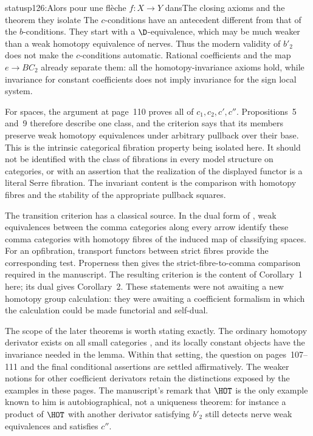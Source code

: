 \begin{dcomment}{status}{p126:Alors pour une flèche $f : X \to Y$ dans}{The closing axioms and the theorem they isolate}
The $c$-conditions have an antecedent different from that of the $b$-conditions. They start with a $\D$-equivalence, which may be much weaker than a weak homotopy equivalence of nerves. Thus the modern validity of $b'_2$ does not make the $c$-conditions automatic. Rational coefficients and the map $e\to BC_2$ already separate them: all the homotopy-invariance axioms hold, while invariance for constant coefficients does not imply invariance for the sign local system.

For spaces, the argument at page~110 proves all of $c_1,c_2,c',c''$. Propositions~5 and~9 therefore describe one class, and the criterion says that its members preserve weak homotopy equivalences under arbitrary pullback over their base. This is the intrinsic categorical fibration property being isolated here. It should not be identified with the class of fibrations in every model structure on categories, or with an assertion that the realization of the displayed functor is a literal Serre fibration. The invariant content is the comparison with homotopy fibres and the stability of the appropriate pullback squares.

The transition criterion has a classical source. In the dual form of \citet[\S1, Theorem~B and its corollary]{Quillen1973}, weak equivalences between the comma categories along every arrow identify these comma categories with homotopy fibres of the induced map of classifying spaces. For an opfibration, transport functors between strict fibres provide the corresponding test. Properness then gives the strict-fibre-to-comma comparison required in the manuscript. The resulting criterion is the content of Corollary~1 here; its dual gives Corollary~2. These statements were not awaiting a new homotopy group calculation: they were awaiting a coefficient formalism in which the calculation could be made functorial and self-dual.

The scope of the later theorems is worth stating exactly. The ordinary homotopy derivator exists on all small categories \citep[Theorem~6.11]{Cisinski2003}, and its locally constant objects have the invariance needed in the lemma. Within that setting, the question on pages~107--111 and the final conditional assertions are settled affirmatively. The weaker notions for other coefficient derivators retain the distinctions exposed by the examples in these pages. The manuscript's remark that $\HOT$ is the only example known to him is autobiographical, not a uniqueness theorem: for instance a product of $\HOT$ with another derivator satisfying $b'_2$ still detects nerve weak equivalences and satisfies $c''$.


\end{dcomment}
